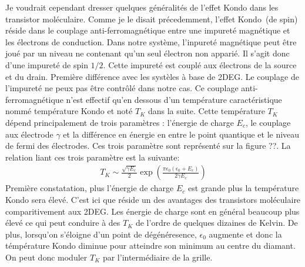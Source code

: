 Je voudrait cependant dresser quelques généralités de l'effet Kondo dans les transistor moléculaire. Comme je le disait précedemment, l'effet Kondo~(de spin) réside dans le couplage anti-ferromagnétique entre une impureté magnétique et les électrons de conduction. Dans notre système, l'inpureté magnétique peut être joué par un niveau ne contenant qu'un seul électron non apparié. Il s'agit donc d'une impureté de spin $1/2$. Cette impureté est couplé aux électrons de la source et du drain. Première différence avec les systèles à base de 2DEG. Le couplage de l'impureté ne peux pas être contrôlé dans notre cas. Ce couplage anti-ferromagnétique n'est effectif qu'en dessous d'un température caractéristique nommé température Kondo et noté $T_K$ dans la suite. Cette température $T_K$ dépend principalement de trois paramètres : l'énergie de charge $E_c$, le couplage aux électrode $\gamma$ et la différence en énergie en entre le point quantique et le niveau de fermi des électrodes. Ces trois paramètre sont représenté sur la figure ??. La relation liant ces trois paramètre est la suivante:
\begin{eqnarray}
T_K \sim \frac{\sqrt{\gamma E_c}}{2} \exp(\frac{\pi \epsilon_0(\epsilon_0 + E_c)}{2\gamma E_c})
\end{eqnarray}
Première constatation, plus l'énergie de charge $E_c$ est grande plus la température Kondo sera élevé. C'est ici que réside un des avantages des transistors moléculaire comparitivement aux 2DEG. Les énergie de charge sont en général beaucoup plus élevé ce qui peut conduire à des $T_K$ de l'ordre de quelques dizaines de Kelvin. De plus, lorsqu'on s'éloigne d'un point de dégénéresence, $\epsilon_0$ augmente et donc la témpérature Kondo diminue pour atteindre son minimum au centre du diamant. On peut donc moduler $T_K$ par l'intermédiaire de la grille.